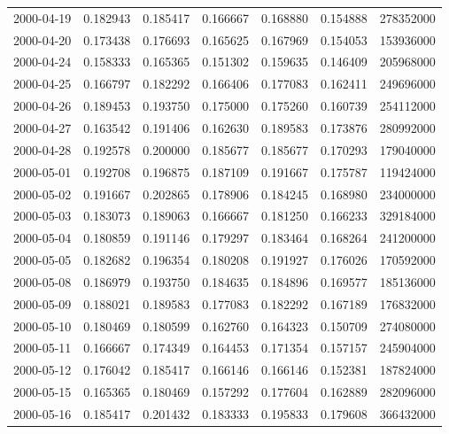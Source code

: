 \begin{tabular}{lrrrrrr}
2000-04-19 &    0.182943 &    0.185417 &    0.166667 &    0.168880 &    0.154888 &   278352000 \\
2000-04-20 &    0.173438 &    0.176693 &    0.165625 &    0.167969 &    0.154053 &   153936000 \\
2000-04-24 &    0.158333 &    0.165365 &    0.151302 &    0.159635 &    0.146409 &   205968000 \\
2000-04-25 &    0.166797 &    0.182292 &    0.166406 &    0.177083 &    0.162411 &   249696000 \\
2000-04-26 &    0.189453 &    0.193750 &    0.175000 &    0.175260 &    0.160739 &   254112000 \\
2000-04-27 &    0.163542 &    0.191406 &    0.162630 &    0.189583 &    0.173876 &   280992000 \\
2000-04-28 &    0.192578 &    0.200000 &    0.185677 &    0.185677 &    0.170293 &   179040000 \\
2000-05-01 &    0.192708 &    0.196875 &    0.187109 &    0.191667 &    0.175787 &   119424000 \\
2000-05-02 &    0.191667 &    0.202865 &    0.178906 &    0.184245 &    0.168980 &   234000000 \\
2000-05-03 &    0.183073 &    0.189063 &    0.166667 &    0.181250 &    0.166233 &   329184000 \\
2000-05-04 &    0.180859 &    0.191146 &    0.179297 &    0.183464 &    0.168264 &   241200000 \\
2000-05-05 &    0.182682 &    0.196354 &    0.180208 &    0.191927 &    0.176026 &   170592000 \\
2000-05-08 &    0.186979 &    0.193750 &    0.184635 &    0.184896 &    0.169577 &   185136000 \\
2000-05-09 &    0.188021 &    0.189583 &    0.177083 &    0.182292 &    0.167189 &   176832000 \\
2000-05-10 &    0.180469 &    0.180599 &    0.162760 &    0.164323 &    0.150709 &   274080000 \\
2000-05-11 &    0.166667 &    0.174349 &    0.164453 &    0.171354 &    0.157157 &   245904000 \\
2000-05-12 &    0.176042 &    0.185417 &    0.166146 &    0.166146 &    0.152381 &   187824000 \\
2000-05-15 &    0.165365 &    0.180469 &    0.157292 &    0.177604 &    0.162889 &   282096000 \\
2000-05-16 &    0.185417 &    0.201432 &    0.183333 &    0.195833 &    0.179608 &   366432000 \\

\end{tabular}
